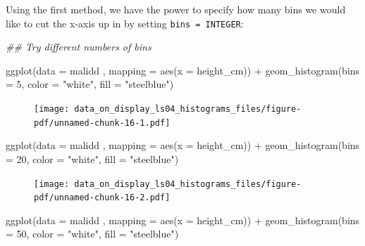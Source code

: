 \documentclass[
  letterpaper,
  DIV=11,
  numbers=noendperiod]{scrreprt}
\newenvironment{Shaded}{\begin{snugshade}}{\end{snugshade}}
\newcommand{\AttributeTok}[1]{\textcolor[rgb]{0.40,0.45,0.13}{#1}}
\newcommand{\DecValTok}[1]{\textcolor[rgb]{0.68,0.00,0.00}{#1}}
\newcommand{\DocumentationTok}[1]{\textcolor[rgb]{0.37,0.37,0.37}{\textit{#1}}}
\newcommand{\FunctionTok}[1]{\textcolor[rgb]{0.28,0.35,0.67}{#1}}
\newcommand{\NormalTok}[1]{\textcolor[rgb]{0.00,0.23,0.31}{#1}}
\newcommand{\SpecialCharTok}[1]{\textcolor[rgb]{0.37,0.37,0.37}{#1}}
\newcommand{\StringTok}[1]{\textcolor[rgb]{0.13,0.47,0.30}{#1}}
\begin{document}
Using the first method, we have the power to specify how many bins we
would like to cut the x-axis up in by setting \texttt{bins\ =\ INTEGER}:

\begin{Shaded}
\begin{Highlighting}[]
\DocumentationTok{\#\# Try different numbers of bins}

\FunctionTok{ggplot}\NormalTok{(}\AttributeTok{data =}\NormalTok{  malidd , }
       \AttributeTok{mapping =} \FunctionTok{aes}\NormalTok{(}\AttributeTok{x =}\NormalTok{ height\_cm)) }\SpecialCharTok{+}
  \FunctionTok{geom\_histogram}\NormalTok{(}\AttributeTok{bins =} \DecValTok{5}\NormalTok{, }
                 \AttributeTok{color =} \StringTok{"white"}\NormalTok{, }
                 \AttributeTok{fill =} \StringTok{"steelblue"}\NormalTok{)}
\end{Highlighting}
\end{Shaded}

\begin{figure}[H]

{\centering \texttt{[image: data\_on\_display\_ls04\_histograms\_files/figure-pdf/unnamed-chunk-16-1.pdf]}

}

\end{figure}

\begin{Shaded}
\begin{Highlighting}[]
\FunctionTok{ggplot}\NormalTok{(}\AttributeTok{data =}\NormalTok{  malidd , }
       \AttributeTok{mapping =} \FunctionTok{aes}\NormalTok{(}\AttributeTok{x =}\NormalTok{ height\_cm)) }\SpecialCharTok{+}
  \FunctionTok{geom\_histogram}\NormalTok{(}\AttributeTok{bins =} \DecValTok{20}\NormalTok{, }
                 \AttributeTok{color =} \StringTok{"white"}\NormalTok{, }
                 \AttributeTok{fill =} \StringTok{"steelblue"}\NormalTok{)}
\end{Highlighting}
\end{Shaded}

\begin{figure}[H]

{\centering \texttt{[image: data\_on\_display\_ls04\_histograms\_files/figure-pdf/unnamed-chunk-16-2.pdf]}

}

\end{figure}

\begin{Shaded}
\begin{Highlighting}[]
\FunctionTok{ggplot}\NormalTok{(}\AttributeTok{data =}\NormalTok{  malidd , }
       \AttributeTok{mapping =} \FunctionTok{aes}\NormalTok{(}\AttributeTok{x =}\NormalTok{ height\_cm)) }\SpecialCharTok{+}
  \FunctionTok{geom\_histogram}\NormalTok{(}\AttributeTok{bins =} \DecValTok{50}\NormalTok{, }
                 \AttributeTok{color =} \StringTok{"white"}\NormalTok{, }
                 \AttributeTok{fill =} \StringTok{"steelblue"}\NormalTok{)}
\end{Highlighting}
\end{Shaded}
\end{document}
